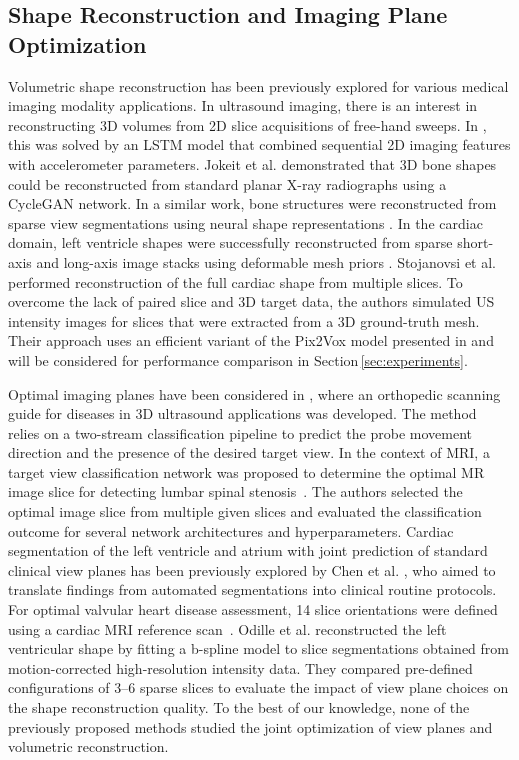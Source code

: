     \subsection{Shape Reconstruction and Imaging Plane Optimization}
    \label{sec:shape_recon_plane_optimization}
     Volumetric shape reconstruction has been previously explored for various medical imaging modality applications.
    In ultrasound imaging, there is an interest in reconstructing 3D volumes from 2D slice acquisitions of free-hand sweeps. In \cite{luo2022deep}, this was solved by an LSTM model that combined sequential 2D imaging features with accelerometer parameters.
    Jokeit et al. \cite{jokeit2022mesh} demonstrated that 3D bone shapes could be reconstructed from standard planar X-ray radiographs using a CycleGAN network.
    In a similar work, bone structures were reconstructed from sparse view segmentations using neural shape representations \cite{amiranashvili2022learning}.
    In the cardiac domain, left ventricle shapes were successfully reconstructed from sparse short-axis and long-axis image stacks using deformable mesh priors \cite{beetz2022reconstructing}.
    Stojanovsi et al. \cite{stojanovski2022efficient} performed reconstruction of the full cardiac shape from multiple slices.
    To overcome the lack of paired slice and 3D target data, the authors simulated US intensity images for slices that were extracted from a 3D ground-truth mesh. Their approach uses an efficient variant of the Pix2Vox
    model presented in \cite{xie2019pix2vox} and will be considered for performance comparison in Section\,\ref{sec:experiments}.

    Optimal imaging planes have been considered in \cite{lee2022usg}, where
    an orthopedic scanning guide for diseases in 3D ultrasound applications was developed. The method relies on a two-stream classification pipeline to predict the probe movement direction and the presence of the desired target view.
    In the context of MRI, a target view classification network was proposed to determine the optimal MR image slice for detecting lumbar spinal stenosis~\cite{natalia2022automated}.
    The authors selected the optimal image slice from multiple given slices and evaluated the classification outcome for several network architectures and hyperparameters.
    Cardiac segmentation of the left ventricle and atrium with joint prediction of standard clinical view planes has been previously explored by Chen et al. \cite{chen2021automated}, who aimed to translate findings from automated segmentations into clinical routine protocols.
    For optimal valvular heart disease assessment, 14 slice orientations were defined using a cardiac MRI reference scan~\cite{nitta2014automatic}.
    Odille et al. \cite{odille2018isotropic} reconstructed the left ventricular shape by fitting a b-spline model to slice segmentations obtained from motion-corrected high-resolution intensity data. They compared pre-defined configurations of 3--6 sparse slices to evaluate the impact of view plane choices on the shape reconstruction quality.
    To the best of our knowledge, none of the previously proposed methods studied the joint optimization of view planes and volumetric reconstruction.

